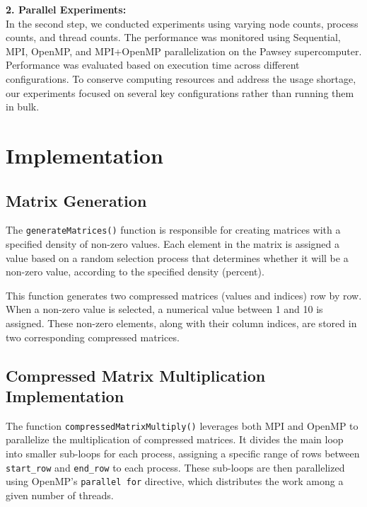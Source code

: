 \documentclass[
]{article}
\begin{document}
\textbf{2. Parallel Experiments:}\\
In the second step, we conducted experiments using varying node counts,
process counts, and thread counts. The performance was monitored using
Sequential, MPI, OpenMP, and MPI+OpenMP parallelization on the Pawsey
supercomputer. Performance was evaluated based on execution time across
different configurations. To conserve computing resources and address
the usage shortage, our experiments focused on several key
configurations rather than running them in bulk.

\vspace{0.5cm}

\section{Implementation}\label{implementation}

\subsection{Matrix Generation}\label{matrix-generation}

The \texttt{generateMatrices()} function is responsible for creating
matrices with a specified density of non-zero values. Each element in
the matrix is assigned a value based on a random selection process that
determines whether it will be a non-zero value, according to the
specified density (percent).

This function generates two compressed matrices (values and indices) row
by row. When a non-zero value is selected, a numerical value between 1
and 10 is assigned. These non-zero elements, along with their column
indices, are stored in two corresponding compressed matrices.

\subsection{Compressed Matrix Multiplication
Implementation}\label{compressed-matrix-multiplication-implementation}

The function \texttt{compressedMatrixMultiply()} leverages both MPI and
OpenMP to parallelize the multiplication of compressed matrices. It
divides the main loop into smaller sub-loops for each process, assigning
a specific range of rows between \texttt{start\_row} and
\texttt{end\_row} to each process. These sub-loops are then parallelized
using OpenMP's \texttt{parallel\ for} directive, which distributes the
work among a given number of threads.
\end{document}
